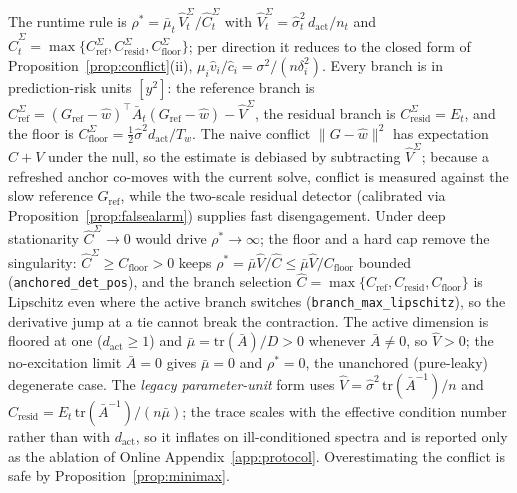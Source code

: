 \begin{remark}
The runtime rule is $\rho^* = \bar\mu_t\,\widehat V^\Sigma_t/\widehat C^\Sigma_t$ with $\widehat V^\Sigma_t = \widehat\sigma^2_t\,d_{\mathrm{act}}/n_t$ and $\widehat C^\Sigma_t = \max\{C^\Sigma_{\mathrm{ref}}, C^\Sigma_{\mathrm{resid}}, C^\Sigma_{\mathrm{floor}}\}$; per direction it reduces to the closed form of Proposition~\ref{prop:conflict}(ii), $\mu_i \hat v_i/\hat c_i = \sigma^2/(n\delta_i^2)$.
Every branch is in prediction-risk units $[y^2]$: the reference branch is $C^\Sigma_{\mathrm{ref}} = (G_{\mathrm{ref}} - \widehat w)^\top \bar A_t (G_{\mathrm{ref}} - \widehat w) - \widehat V^\Sigma$, the residual branch is $C^\Sigma_{\mathrm{resid}} = E_t$, and the floor is $C^\Sigma_{\mathrm{floor}} = \tfrac12 \widehat\sigma^2 d_{\mathrm{act}}/T_w$.
The naive conflict $\|G - \widehat w\|^2$ has expectation $C + V$ under the null, so the estimate is debiased by subtracting $\widehat V^\Sigma$; because a refreshed anchor co-moves with the current solve, conflict is measured against the slow reference $G_{\mathrm{ref}}$, while the two-scale residual detector (calibrated via Proposition~\ref{prop:falsealarm}) supplies fast disengagement.
Under deep stationarity $\widehat C^\Sigma \to 0$ would drive $\rho^* \to \infty$; the floor and a hard cap remove the singularity: $\widehat C^\Sigma \ge C_{\mathrm{floor}} > 0$ keeps $\rho^* = \bar\mu\widehat V/\widehat C \le \bar\mu\widehat V/C_{\mathrm{floor}}$ bounded (\texttt{anchored\_det\_pos}), and the branch selection $\widehat C = \max\{C_{\mathrm{ref}}, C_{\mathrm{resid}}, C_{\mathrm{floor}}\}$ is Lipschitz even where the active branch switches (\texttt{branch\_max\_lipschitz}), so the derivative jump at a tie cannot break the contraction. The active dimension is floored at one ($d_{\mathrm{act}} \ge 1$) and $\bar\mu = \mathrm{tr}(\bar A)/D > 0$ whenever $\bar A \ne 0$, so $\widehat V > 0$; the no-excitation limit $\bar A = 0$ gives $\bar\mu = 0$ and $\rho^* = 0$, the unanchored (pure-leaky) degenerate case.
The \emph{legacy parameter-unit} form uses $\widehat V = \widehat\sigma^2\,\mathrm{tr}(\bar A^{-1})/n$ and $C_{\mathrm{resid}} = E_t\,\mathrm{tr}(\bar A^{-1})/(n\bar\mu)$; the trace scales with the effective condition number rather than with $d_{\mathrm{act}}$, so it inflates on ill-conditioned spectra and is reported only as the ablation of Online Appendix~\ref{app:protocol}.
Overestimating the conflict is safe by Proposition~\ref{prop:minimax}.
\end{remark}

